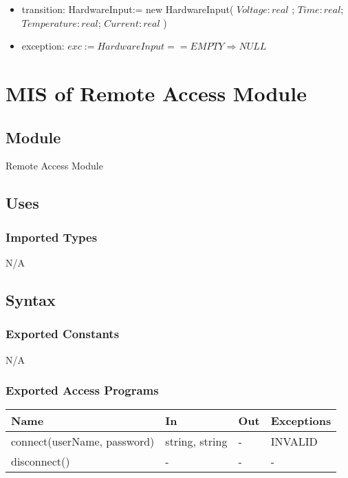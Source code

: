 \documentclass[12pt, titlepage]{article}
\begin{document}
\begin{itemize}
  \item transition: HardwareInput:= new HardwareInput( $Voltage: real $ ; $Time: real$; $Temperature: real$; $Current: real$ )
  \item exception: $exc:= HardwareInput == EMPTY \Rightarrow NULL$
\end{itemize}

\section{MIS of Remote Access Module} \label{RA} 

\subsection{Module}

Remote Access Module

\subsection{Uses}

\subsubsection{Imported Types}
N/A
\subsection{Syntax}

\subsubsection{Exported Constants}
N/A
\subsubsection{Exported Access Programs}

\begin{center}
\begin{tabular}{p{7cm} p{3cm} p{1cm} p{3cm}}
\hline
\textbf{Name} & \textbf{In} & \textbf{Out} & \textbf{Exceptions} \\
\hline
connect(userName, password) & string, string & - & INVALID \\
disconnect() & -  & - & - \\
\hline
\end{tabular}
\end{center}
\end{document}
